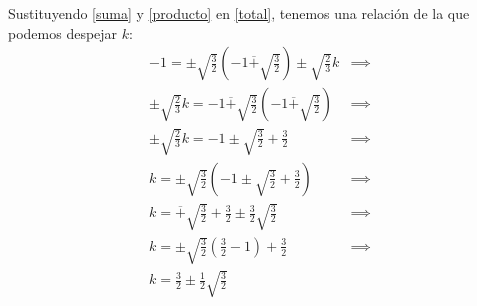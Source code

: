 \documentclass[a4paper, 11pt]{article}
\begin{document}
\begin{solucion}
      Sustituyendo \ref{suma} y \ref{producto} en \ref{total}, tenemos una relación de la que podemos despejar $k$:
      \begin{align*}
          -1 = \pm\sqrt{\frac{3}{2}}(-1\overline{+}\sqrt{\frac{3}{2}})\pm\sqrt{\frac{2}{3}}k &\implies \\
          \pm\sqrt{\frac{2}{3}}k = -1 \overline{+}\sqrt{\frac{3}{2}}(-1\overline{+}\sqrt{\frac{3}{2}}) &\implies \\
          \pm\sqrt{\frac{2}{3}}k = -1 \pm\sqrt{\frac{3}{2}} + \frac{3}{2} &\implies \\
          k = \pm\sqrt{\frac{3}{2}}(-1 \pm\sqrt{\frac{3}{2}} + \frac{3}{2}) &\implies \\
          k = \overline{+}\sqrt{\frac{3}{2}} + \frac{3}{2} \pm\frac{3}{2}\sqrt{\frac{3}{2}} &\implies \\
          k = \pm\sqrt{\frac{3}{2}}(\frac{3}{2}-1) + \frac{3}{2} &\implies \\
          \boxed{k = \frac{3}{2} \pm \frac{1}{2}\sqrt{\frac{3}{2}}} &
      \end{align*}



  \end{solucion}
\end{document}
